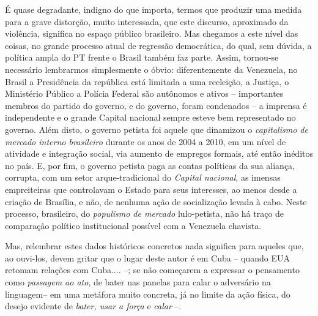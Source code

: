 É quase degradante, indigno do que importa, termos que produzir uma
medida para a grave distorção, muito interessada, que este discurso,
aproximado da violência, significa no espaço público brasileiro. Mas
chegamos a este nível das coisas, no grande processo atual de regressão
democrática, do qual, sem dúvida, a política ampla do PT frente o Brasil
também faz parte. Assim, tornou-se necessário lembrarmos simplesmente o
óbvio: diferentemente da Venezuela, no Brasil a Presidência da república
está limitada a uma reeleição, a Justiça, o Ministério Público a Polícia
Federal são autônomos e ativos -- importantes membros do partido do
governo, e do governo, foram condenados -- a imprensa é independente e o
grande Capital nacional sempre esteve bem representado no governo. Além
disto, o governo petista foi aquele que dinamizou o \emph{capitalismo de
mercado interno brasileiro} durante os anos de 2004 a 2010, em um nível
de atividade e integração social, via aumento de empregos formais, até
então inéditos no país. E, por fim, o governo petista paga as contas
políticas da sua aliança, corrupta, com um setor arque-tradicional do
\emph{Capital nacional}, as imensas empreiteiras que controlavam o
Estado para seus interesses, ao menos desde a criação de Brasília, e
não, de nenhuma ação de socialização levada à cabo. Neste processo,
brasileiro, do \emph{populismo de mercado} lulo-petista, não há traço de
comparação político institucional possível com a Venezuela chavista.

Mas, relembrar estes dados históricos concretos nada significa para
aqueles que, ao ouvi-los, devem gritar que o lugar deste autor é em Cuba
-- quando EUA retomam relações com Cuba.... --; se não começarem a
expressar o pensamento como \emph{passagem ao ato}, de bater nas panelas
para calar o adversário na linguagem-- em uma metáfora muito concreta,
já no limite da ação física, do desejo evidente de \emph{bater, usar a
força} e \emph{calar} --.

